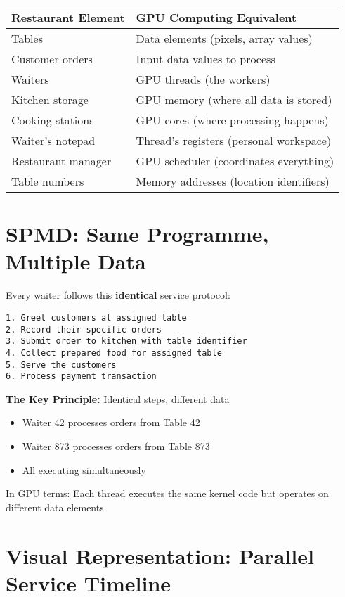 \documentclass[11pt, a4paper]{article}
\begin{document}
\begin{table}[h!]
\centering
\begin{tabular}{ll}
\toprule
Restaurant Element & GPU Computing Equivalent \\
\midrule
Tables & Data elements (pixels, array values) \\
Customer orders & Input data values to process \\
Waiters & GPU threads (the workers) \\
Kitchen storage & GPU memory (where all data is stored) \\
Cooking stations & GPU cores (where processing happens) \\
Waiter's notepad & Thread's registers (personal workspace) \\
Restaurant manager & GPU scheduler (coordinates everything) \\
Table numbers & Memory addresses (location identifiers) \\
\bottomrule
\end{tabular}
\end{table}

\section*{SPMD: Same Programme, Multiple Data}

Every waiter follows this \textbf{identical} service protocol:

\begin{lstlisting}
1. Greet customers at assigned table
2. Record their specific orders
3. Submit order to kitchen with table identifier
4. Collect prepared food for assigned table
5. Serve the customers
6. Process payment transaction
\end{lstlisting}

\textbf{The Key Principle:} Identical steps, different data
\begin{itemize}
    \item Waiter 42 processes orders from Table 42
    \item Waiter 873 processes orders from Table 873
    \item All executing simultaneously
\end{itemize}

In GPU terms: Each thread executes the same kernel code but operates on
different data elements.

\section*{Visual Representation: Parallel Service Timeline}
\end{document}
